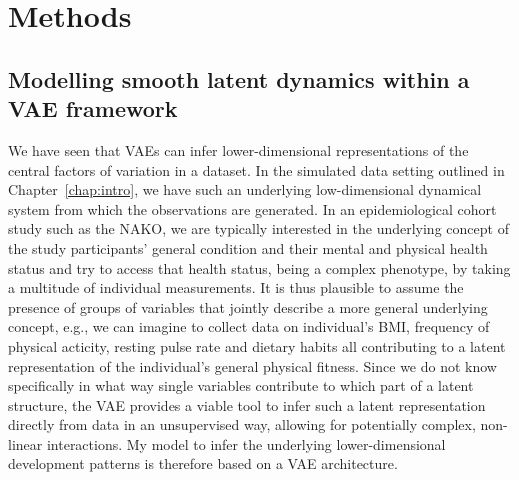 \chapter{Methods}\label{chap:methods}
\fancyhead[LO]{\nouppercase{\leftmark}}

\section{Modelling smooth latent dynamics within a VAE framework}\label{sec:methods-generalintro}

We have seen that VAEs can infer lower-dimensional representations of the central factors of variation in a dataset. In the simulated data setting outlined in Chapter~\ref{chap:intro}, we have such an underlying low-dimensional dynamical system from which the observations are generated.
In an epidemiological cohort study such as the NAKO, we are typically interested in the underlying concept of the study participants' general condition and their mental and physical health status and try to access that health status, being a complex phenotype, by taking a multitude of individual measurements. It is thus plausible to assume the presence of groups of variables that jointly describe a more general underlying concept, e.g., we can imagine to collect data on individual's BMI, frequency of physical acticity, resting pulse rate and dietary habits all contributing to a latent representation of the individual's general physical fitness. 
Since we do not know specifically in what way single variables contribute to which part of a latent structure, the VAE provides a viable tool to infer such a latent representation directly from data in an unsupervised way, allowing for potentially complex, non-linear interactions. My model to infer the underlying lower-dimensional development patterns is therefore based on a VAE architecture.

